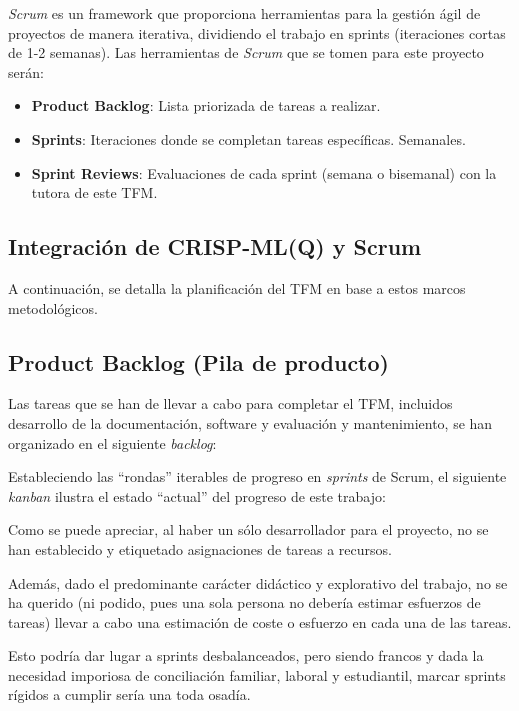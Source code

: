 \emph{Scrum} es un framework que proporciona herramientas para la gestión ágil de proyectos de manera iterativa, dividiendo el trabajo en sprints (iteraciones cortas de 1-2 semanas). Las herramientas de \emph{Scrum} que se tomen para este proyecto serán:

\begin{itemize}
    \item \textbf{Product Backlog}: Lista priorizada de tareas a realizar.
    \item \textbf{Sprints}: Iteraciones donde se completan tareas específicas. Semanales.
    \item \textbf{Sprint Reviews}: Evaluaciones de cada sprint (semana o bisemanal) con la tutora de este TFM.
\end{itemize}

\subsection{Integración de CRISP-ML(Q) y Scrum}

A continuación, se detalla la planificación del TFM en base a estos marcos metodológicos.

\subsection{Product Backlog (Pila de producto)}

Las tareas que se han de llevar a cabo para completar el TFM, incluidos desarrollo de la documentación, software y evaluación y mantenimiento, se han organizado en el siguiente \emph{backlog}:



\clearpage

\clearpage
% 
Estableciendo las ``rondas'' iterables de progreso en \emph{sprints} de Scrum, el siguiente \emph{kanban} ilustra el estado ``actual'' del progreso de este trabajo:

%
\clearpage
Como se puede apreciar, al haber un sólo desarrollador para el proyecto, no se han establecido y etiquetado asignaciones de tareas a recursos.

Además, dado el predominante carácter didáctico y explorativo del trabajo, no se ha querido (ni podido, pues una sola persona no debería estimar esfuerzos de tareas) llevar a cabo una estimación de coste o esfuerzo en cada una de las tareas.

Esto podría dar lugar a sprints desbalanceados, pero siendo francos y dada la necesidad imporiosa de conciliación familiar, laboral y estudiantil, marcar sprints rígidos a cumplir sería una toda osadía.

